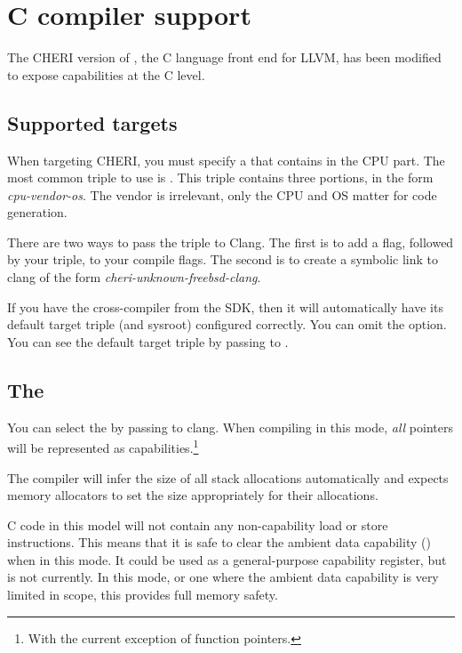\chapter{C compiler support}

The CHERI version of , the C language front end for LLVM, has been modified to expose capabilities at the C level.

\section{Supported targets}

When targeting CHERI, you must specify a  that contains  in the CPU part.  The most common triple to use is .  This triple contains three portions, in the form \textit{cpu-vendor-os}.  The vendor is irrelevant, only the CPU and OS matter for code generation.

There are two ways to pass the triple to Clang.  The first is to add a  flag, followed by your triple, to your compile flags.  The second is to create a symbolic link to clang of the form \textit{cheri-unknown-freebsd-clang}.  

\begin{notebox}{}
If you have the cross-compiler from the SDK, then it will automatically have its default target triple (and sysroot) configured correctly.  You can omit the  option.  You can see the default target triple by passing  to .
\end{notebox}

\section{The \sandboxABI}

You can select the \sandboxABI{} by passing  to clang.  When compiling in this mode, \textit{all} pointers will be represented as capabilities.\footnote{With the current exception of function pointers.}

The compiler will infer the size of all stack allocations automatically and expects memory allocators to set the size appropriately for their allocations.

C code in this model will not contain any non-capability load or store instructions.  This means that it is safe to clear the ambient data capability () when in this mode.  It could be used as a general-purpose capability register, but is not currently.  In this mode, or one where the ambient data capability is very limited in scope, this provides full memory safety.

